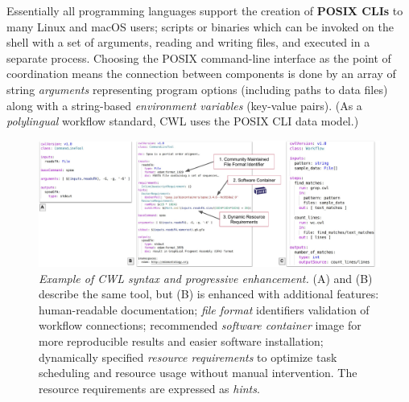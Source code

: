 \documentclass[sigconf,authordraft]{acmart}
\begin{document}
Essentially all programming languages support the creation of \textbf{POSIX CLIs}  to many Linux and macOS users; scripts or binaries which can be invoked on the shell with a set of arguments, reading and writing files, and executed in a separate process. Choosing the POSIX command-line interface as the point of coordination means the connection between components is done by an array of string \textit{arguments} representing program options (including paths to data files) along with a string-based \textit{environment variables} (key-value pairs).   (As a \textit{polylingual} workflow standard, CWL uses the POSIX CLI data model.)

\begin{figure}
  \centering
  \includegraphics[width=\textwidth]{figure3b}
  \caption{\emph{Example of CWL syntax and progressive enhancement.} (A) and (B) describe the same tool, but (B) is enhanced with additional features:
  human-readable documentation;
  \textit{file format} identifiers 
  validation of workflow connections;
  recommended \textit{software container} image for more reproducible results and easier software installation;
  dynamically specified \textit{resource requirements} to optimize task scheduling and resource usage without manual intervention. The resource requirements are expressed as \textit{hints}. }
  \label{fig:syntax}
 \end{figure}
 
\end{document}
